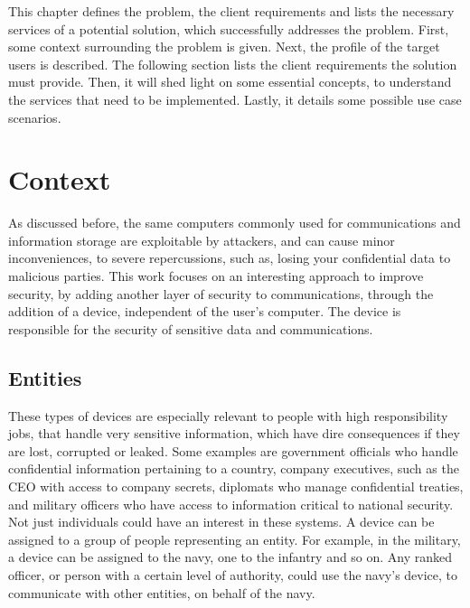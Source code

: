 \cleardoublepage
\label{chap:problem}

This chapter defines the problem, the client requirements and lists the necessary services of a potential solution, which successfully addresses the problem.
First, some context surrounding the problem is given. Next, the profile of the target users is described. The following section lists the client requirements the solution must provide.
Then, it will shed light on some essential concepts, to understand the services that need to be implemented. Lastly, it details some possible use case scenarios.

\section{Context}\label{chap:problem:context}

As discussed before, the same computers commonly used for communications and information storage are exploitable by attackers, and can cause minor inconveniences, to severe repercussions, such as, losing your confidential data to malicious parties.
This work focuses on an interesting approach to improve security, by adding another layer of security to communications, through the addition of a device, independent of the user's computer. The device is responsible for the security of sensitive data and communications.

\subsection{Entities}\label{chap:problem:entities}

These types of devices are especially relevant to people with high responsibility jobs, that handle very sensitive information, which have dire consequences if they are lost, corrupted or leaked.
Some examples are government officials who handle confidential information pertaining to a country, company executives, such as the CEO with access to company secrets, diplomats who manage confidential treaties, and military officers who have access to information critical to national security.
Not just individuals could have an interest in these systems. A device can be assigned to a group of people representing an entity. For example, in the military, a device can be assigned to the navy, one to the infantry and so on. Any ranked officer, or person with a certain level of authority, could use the navy's device, to communicate with other entities, on behalf of the navy.

